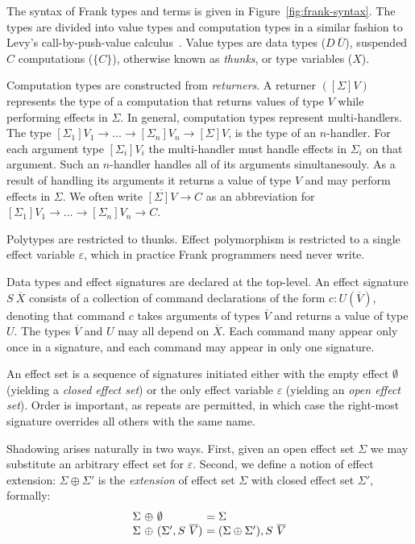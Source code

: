 \documentclass[preprint]{sigplanconf}
\newcommand{\many}{\overline}
\newcommand\ba{\begin{array}}
\newcommand\ea{\end{array}}
\newcommand{\sig}{S}
\newcommand{\sigs}{\Sigma}
\newcommand{\effbox}[1]{[#1]}
\newcommand{\thunk}[1]{\{{#1}\}}
\begin{document}
%
The syntax of Frank types and terms is given in
Figure~\ref{fig:frank-syntax}. The types are divided into value types
and computation types in a similar fashion to Levy's
call-by-push-value calculus~\cite{Levy2004}.
%
Value types are data types ($D~\many{U}$), suspended $C$ computations
($\thunk{C}$), otherwise known as \emph{thunks}, or type variables
($X$).

Computation types are constructed from \emph{returners}.  A returner
$(\effbox{\sigs}V)$ represents the type of a computation that returns
values of type $V$ while performing effects in $\sigs$.
%
In general, computation types represent multi-handlers. The type
$\effbox{\sigs_1}V_1 \to \dots \to \effbox{\sigs_n}V_n \to
\effbox{\sigs}V$,
%
is the type of an $n$-handler. For each argument type
$\effbox{\sigs_i}V_i$ the multi-handler must handle effects in
$\sigs_i$ on that argument. Such an $n$-handler handles all of its
arguments simultanesouly. As a result of handling its arguments it
returns a value of type $V$ and may perform effects in $\sigs$.
%
We often write $\many{\effbox{\sigs}V} \to C$ as an abbreviation for
$\effbox{\sigs_1}V_1 \to \dots \to \effbox{\sigs_n}V_n \to C$.

Polytypes are restricted to thunks. Effect polymorphism is restricted
to a single effect variable $\varepsilon$, which in practice Frank
programmers need never write.

Data types and effect signatures are declared at the top-level. An
effect signature $S~\many{X}$ consists of a collection of command
declarations of the form $c:U(\many{V})$, denoting that command $c$
takes arguments of types $\many{V}$ and returns a value of type
$U$. The types $\many{V}$ and $U$ may all depend on $\many{X}$. Each
command many appear only once in a signature, and each command may
appear in only one signature.

An effect set is a sequence of signatures initiated either with the
empty effect $\emptyset$ (yielding a \emph{closed effect set}) or the
only effect variable $\varepsilon$ (yielding an \emph{open effect
  set}). Order is important, as repeats are permitted, in which case
the right-most signature overrides all others with the same name.

Shadowing arises naturally in two ways. First, given an open effect
set $\sigs$ we may substitute an arbitrary effect set for
$\varepsilon$. Second, we define a notion of effect extension: $\sigs
\oplus \sigs'$ is the \emph{extension} of effect set $\sigs$ with
closed effect set $\sigs'$, formally:
%
\[\ba{@{\sigs~\oplus~}l@{~}l@{}}
\emptyset               &= \sigs \\
(\sigs', \sig~\many{V}) &= (\sigs \oplus \sigs'), \sig~\many{V} \\
\ea\]
\end{document}
